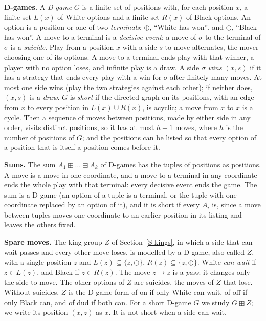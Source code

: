 \textbf{D-games.} A \emph{D-game} $G$ is a finite set of positions with, for each position $x$, a finite set $L(x)$ of
White options and a finite set $R(x)$ of Black options. An option is a position or one of two \emph{terminals}:
$\oplus$, ``White has won'', and $\ominus$, ``Black has won''. A move to a terminal is a \emph{decisive event}; a move of
$\sigma$ to the terminal of $\bar\sigma$ is a \emph{suicide}. Play from a position $x$ with a side $s$ to move
alternates, the mover choosing one of its options. A move to a terminal ends play with that winner, a player with no
option loses, and infinite play is a draw. A side $\sigma$ \emph{wins} $(x,s)$ if it has a strategy that ends every play
with a win for $\sigma$ after finitely many moves. At most one side wins (play the two strategies against each other);
if neither does, $(x,s)$ is a \emph{draw}. $G$ is \emph{short} if the directed graph on its positions, with an edge from
$x$ to every position in $L(x)\cup R(x)$, is acyclic; a move from $x$ to $x$ is a cycle. Then a sequence of moves
between positions, made by either side in any order, visits distinct positions, so it has at most $h-1$ moves, where $h$
is the number of positions of $G$; and the positions can be listed so that every option of a position that is itself a
position comes before it.

\textbf{Sums.} The sum $A_1\boxplus\dots\boxplus A_k$ of D-games has the tuples of positions as positions. A move is a
move in one coordinate, and a move to a terminal in any coordinate ends the whole play with that terminal: every
decisive event ends the game. The sum is a D-game (an option of a tuple is a terminal, or the tuple with one coordinate
replaced by an option of it), and it is short if every $A_i$ is, since a move between tuples moves one coordinate
to an earlier position in its listing and leaves the others fixed.

\textbf{Spare moves.} The king group $Z$ of Section~\ref{S-kings}, in which a side that can wait passes and every other
move loses, is modelled by a D-game, also called $Z$, with a single position $z$ and $L(z)\subseteq\{z,\ominus\}$,
$R(z)\subseteq\{z,\oplus\}$. White \emph{can wait} if $z\in L(z)$, and Black if $z\in R(z)$. The move $z\to z$ is a
\emph{pass}: it changes only the side to move. The other options of $Z$ are suicides, the moves of $Z$ that lose. Without
suicides, $Z$ is the D-game form of $\mathrm{on}$ if only White can wait, of $\mathrm{off}$ if only Black can, and of
$\mathrm{dud}$ if both can. For a short D-game $G$ we study $G\boxplus Z$; we write its position $(x,z)$ as $x$. It is not
short when a side can wait.

